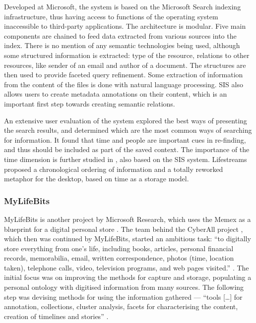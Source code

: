 Developed at Microsoft, the system is based on the Microsoft Search indexing infrastructure, thus having access to functions of the operating system inaccessible to third-party applications. The architecture is modular. Five main components are chained to feed data extracted from various sources into the index. There is no mention of any semantic technologies being used, although some structured information is extracted: type of the resource, relations to other resources, like sender of an email and author of a document. The structures are then used to provide faceted query refinement. Some extraction of information from the content of the files is done with natural language processing. SIS also allows users to create metadata annotations on their content, which is an important first step towards creating semantic relations.

An extensive user evaluation of the system explored the best ways of presenting the search results, and determined which are the most common ways of searching for information. 
It found that time and people are important cues in re-finding, and thus should be included as part of the saved context. 
The importance of the time dimension is further studied in \cite{Ringel2003}, also based on the SIS system. 
Lifestreams \cite{Freeman1995,Fertig1996,Freeman2007} proposed a chronological ordering of information and a totally reworked metaphor for the desktop, based on time as a storage model. 

\subsubsection{MyLifeBits}

MyLifeBits \cite{Gemmell2002,Gemmell2003a,Bell2007} is another project by Microsoft Research, which uses the Memex as a blueprint for a digital personal store \cite{Gemmell2006}. The team behind the CyberAll project \cite{Bell2001}, which then was continued by MyLifeBits, started an ambitious task: ``to digitally store everything from one’s life, including books, articles, personal financial records, memorabilia, email, written correspondence, photos (time, location taken), telephone calls, video, television programs, and web pages visited.'' \cite{Bell2004}. The initial focus was on improving the methods for capture and storage, populating a personal ontology with digitised information from many sources. The following step was devising methods for using the information gathered --- ``tools [\dots] for annotation, collections, cluster analysis, facets for characterising the content, creation of timelines and stories'' \cite{Bell2004}.

